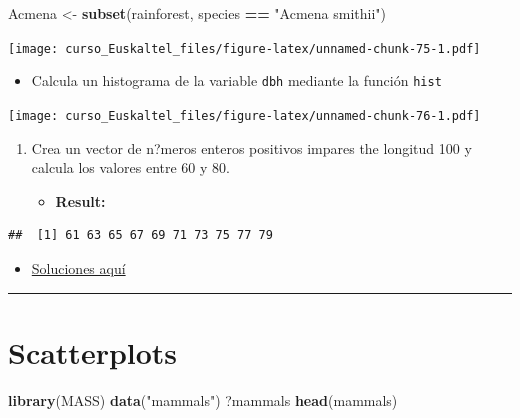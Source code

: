 \documentclass[]{book}
\newenvironment{Shaded}{\begin{snugshade}}{\end{snugshade}}
\newcommand{\KeywordTok}[1]{\textcolor[rgb]{0.13,0.29,0.53}{\textbf{#1}}}
\newcommand{\StringTok}[1]{\textcolor[rgb]{0.31,0.60,0.02}{#1}}
\newcommand{\OperatorTok}[1]{\textcolor[rgb]{0.81,0.36,0.00}{\textbf{#1}}}
\newcommand{\NormalTok}[1]{#1}
\providecommand{\tightlist}{%
  \setlength{\itemsep}{0pt}\setlength{\parskip}{0pt}}
\begin{document}
\begin{Shaded}
\begin{Highlighting}[]
\NormalTok{Acmena <-}\StringTok{ }\KeywordTok{subset}\NormalTok{(rainforest, species }\OperatorTok{==}\StringTok{ "Acmena smithii"}\NormalTok{)}
\end{Highlighting}
\end{Shaded}

\texttt{[image: curso\_Euskaltel\_files/figure-latex/unnamed-chunk-75-1.pdf]}

\begin{itemize}
\tightlist
\item
  Calcula un histograma de la variable \texttt{dbh} mediante la función
  \texttt{hist}
\end{itemize}

\texttt{[image: curso\_Euskaltel\_files/figure-latex/unnamed-chunk-76-1.pdf]}

\begin{enumerate}
\def\labelenumi{\arabic{enumi}.}
\setcounter{enumi}{3}
\item
  Crea un vector de n?meros enteros positivos impares the longitud 100 y
  calcula los valores entre 60 y 80.

  \begin{itemize}
  \tightlist
  \item
    \textbf{Result:}
  \end{itemize}
\end{enumerate}

\begin{verbatim}
##  [1] 61 63 65 67 69 71 73 75 77 79
\end{verbatim}

\begin{itemize}
\tightlist
\item
  \href{http://idaejin.github.io/bcam-courses/rbasics/rbasics_sol.R}{Soluciones
  aquí}
\end{itemize}

\begin{center}\rule{0.5\linewidth}{\linethickness}\end{center}

\section{Scatterplots}\label{scatterplots}

\begin{Shaded}
\begin{Highlighting}[]
\KeywordTok{library}\NormalTok{(MASS)}
\KeywordTok{data}\NormalTok{(}\StringTok{"mammals"}\NormalTok{)}
\NormalTok{?mammals}
\KeywordTok{head}\NormalTok{(mammals)}
\end{Highlighting}
\end{Shaded}
\end{document}
